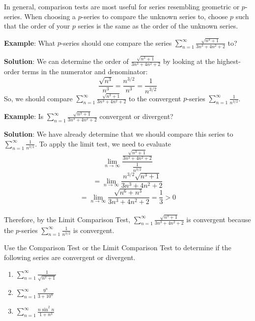 In general, comparison tests are most useful for series resembling geometric 
or $p$-series. When choosing a $p$-series to compare the unknown series to, 
choose $p$ such that the order of your $p$ series is the same as the order of 
the unknown series.

\textbf{Example}: What $p$-series should one compare the series $\sum_{n=1}^
\infty \frac{\sqrt{n^3 + 1}}{3n^3 + 4n^2 + 2}$ to?

\textbf{Solution}: We can determine the order of $\frac{\sqrt{n^3 + 1}}{3n^3 
+ 4n^2 + 2}$ by looking at the highest-order terms in the numerator and 
denominator:
$$\frac{\sqrt{n^3}}{n^3} = \frac{n^{3/2}}{n^3} = \frac{1}{n^{3/2}}$$
So, we should compare $\sum_{n=1}^\infty \frac{\sqrt{n^3 + 1}}{3n^3 + 4n^2 + 2}$ 
to the convergent $p$-series $\sum_{n=1}^\infty \frac{1}{n^{3/2}}$.

\textbf{Example}: Is $\sum_{n=1}^\infty \frac{\sqrt{n^3 + 1}}{3n^3 + 4n^2 + 2}$ 
convergent or divergent?

\textbf{Solution}: We have already determine that we should compare this 
series to $\sum_{n=1}^\infty \frac{1}{n^{3/2}}$. To apply the limit test, 
we need to evaluate
$$\lim_{n \to \infty} \frac{\frac{\sqrt{n^3 + 1}}{3n^3 + 4n^2 + 2}}{\frac{1}{n^
{3/2}}}$$
$$= \lim_{n \to \infty} \frac{n^{3/2} \sqrt{n^3 + 1}}{3n^3 + 4n^2 + 2} $$
$$= \lim_{n \to \infty} \frac{\sqrt{n^6 + n^3}}{3n^3 + 4n^2 + 2} = \frac{1}{3} 
> 0$$\\
Therefore, by the Limit Comparison Test, $\sum_{n=1}^\infty \frac{\sqrt{n^3 + 
1}}{3n^3 + 4n^2 + 2}$ is convergent because the $p$-series $\sum_{n=1}^\infty 
\frac{1}{n^{3/2}}$ is convergent. 

\begin{Exercise}[label = comp1]
Use the Comparison Test or the Limit Comparison Test to determine if the 
following series are convergent or divergent. 
\begin{enumerate}
\item $\sum_{n=1}^\infty \frac{1}{\sqrt{n^2 + 1}}$
\item $\sum_{n=1}^\infty \frac{9^n}{3 + 10^n}$
\item $\sum_{n=1}^\infty \frac{n \sin^2{n}}{1 + n^3}$
\vspace{50mm}
\end{enumerate}
\end{Exercise}

